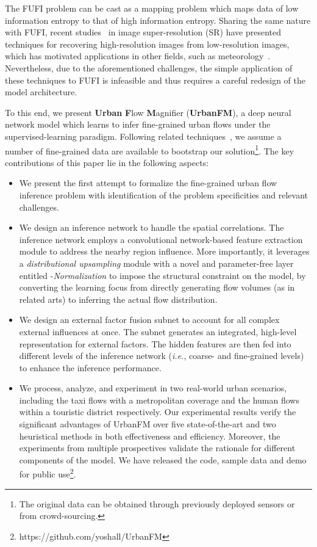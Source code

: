 The FUFI problem can be cast as a mapping problem which maps data of low information entropy to that of high information entropy. Sharing the same nature with FUFI, recent studies~\cite{dong2016srcnn,lim2017enhanced,ledig2017srgan} in image super-resolution (SR) have presented techniques for recovering high-resolution images from low-resolution images, which has motivated applications in other fields, such as meteorology~\cite{vandal2017deepsd}. Nevertheless, due to the aforementioned challenges, the simple application of these techniques to FUFI is infeasible and thus requires a careful redesign of the model architecture.

To this end, we present \textbf{Urban} \textbf{F}low \textbf{M}agnifier (\textbf{UrbanFM}), a deep neural network model which learns to infer fine-grained urban flows under the supervised-learning paradigm. Following related techniques~\cite{dong2016srcnn,lim2017enhanced,ledig2017srgan,vandal2017deepsd}, we assume a number of fine-grained data are available to bootstrap our solution\footnote{The original data can be obtained through previously deployed sensors or from crowd-sourcing.}. The key contributions of this paper lie in the following aspects:
\begin{itemize}[leftmargin=*]
\item{We present the first attempt to formalize the fine-grained urban flow inference problem with identification of the problem specificities and relevant challenges.}
\item{We design an inference network to handle the spatial correlations. The inference network employs a convolutional network-based feature extraction module to address the nearby region influence. More importantly, it leverages a   \textit{distributional upsampling} module with a novel and parameter-free layer entitled -\textit{Normalization} to impose the structural constraint on the model, by converting the learning focus from directly generating flow volumes (as in related arts) to inferring the actual flow distribution.}
\item{We design an external factor fusion subnet to account for all complex external influences at once. The subnet generates an integrated, high-level representation for external factors. The hidden features are then fed into different levels of the inference network (\emph{i.e.}, coarse- and fine-grained levels) to enhance the inference performance.}
\item{We process, analyze, and experiment in two real-world urban scenarios, including the taxi flows with a metropolitan coverage and the human flows within a touristic district respectively. Our experimental results verify the significant advantages of UrbanFM over five state-of-the-art and two heuristical methods in both effectiveness and efficiency. Moreover, the experiments from multiple prospectives validate the rationale for different components of the model. We have released the code, sample data and demo for public use\footnote{https://github.com/yoshall/UrbanFM}.}
\end{itemize}




